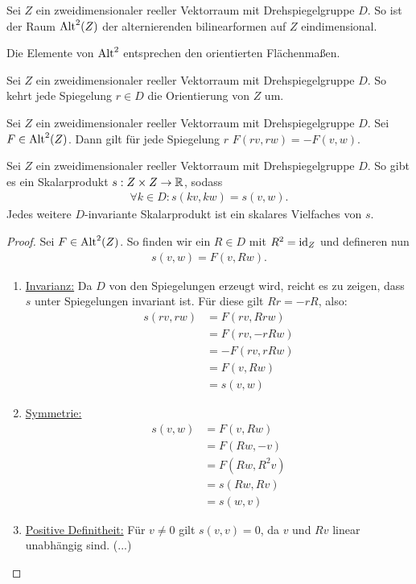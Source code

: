 \documentclass{report}
\begin{document}
\begin{lemma}
	Sei $Z$ ein zweidimensionaler reeller Vektorraum mit Drehspiegelgruppe $D$. So ist der Raum $\textnormal{Alt}^2(Z)$ der alternierenden bilinearformen auf $Z$ eindimensional.
\end{lemma}
Die Elemente von $\textnormal{Alt}^2$ entsprechen den orientierten Flächenmaßen.
\begin{lemma}
	Sei $Z$ ein zweidimensionaler reeller Vektorraum mit Drehspiegelgruppe $D$. So kehrt jede Spiegelung $r \in D$ die Orientierung von $Z$ um.
\end{lemma}
\begin{corollary}
	Sei $Z$ ein zweidimensionaler reeller Vektorraum mit Drehspiegelgruppe $D$. Sei $F \in \textnormal{Alt}^2(Z)$. Dann gilt für jede Spiegelung $r$ $F(rv, rw) = -F(v,w)$.
\end{corollary}
\begin{theorem}
	Sei $Z$ ein zweidimensionaler reeller Vektorraum mit Drehspiegelgruppe $D$. So gibt es ein Skalarprodukt $s : Z \times Z \to \mathbb{R}$, sodass
	\begin{align*}
		\forall k \in D : s(kv, kw) = s(v,w).
	\end{align*}
	Jedes weitere $D$-invariante Skalarprodukt ist ein skalares Vielfaches von $s$.
\end{theorem}
\begin{proof}
	Sei $F \in \textnormal{Alt}^2(Z)$. So finden wir ein $R \in D$ mit $R^2 = \textnormal{id}_Z$ und defineren nun
	\begin{align*}
		s(v,w) = F(v,Rw).
	\end{align*}
	\begin{enumerate}
		\item \ul{Invarianz:} Da $D$ von den Spiegelungen erzeugt wird, reicht es zu zeigen, dass $s$ unter Spiegelungen invariant ist. Für diese gilt $Rr = -rR$, also:
		\begin{align*}
			s(rv,rw) 
			&= F(rv,Rrw)\\
			&= F(rv, -rRw)\\
			&= -F(rv, rRw)\\
			&= F(v,Rw)\\
			&= s(v,w)
		\end{align*}
		\item \ul{Symmetrie:}
		\begin{align*}
			s(v,w) 
			&= F(v,Rw)\\
			&= F(Rw, -v)\\
			&= F(Rw, R^2v)\\
			&= s(Rw,Rv)\\
			&= s(w,v)
		\end{align*}
		\item \ul{Positive Definitheit:} Für $v \neq 0$ gilt $s(v,v) = 0$, da $v$ und $Rv$ linear unabhängig sind. (...)
	\end{enumerate}
\end{proof}
\end{document}
